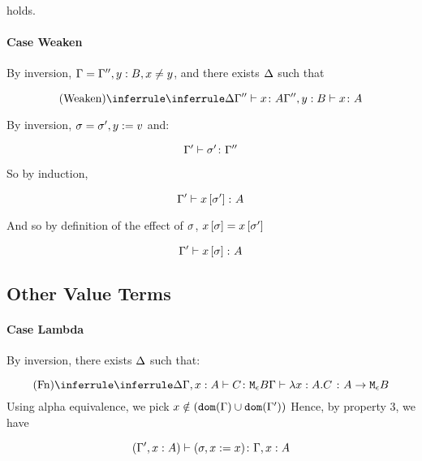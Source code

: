 {            holds.
            
        \paragraph{Case Weaken}
            By inversion, $\Gamma = \Gamma'', y: B, x \neq y$, and there exists $\Delta$ such that
 
            \begin{equation}
                \ntreeruleI{Weaken}{\treeruleI{\D}{\typerelation{\G''}{x}{A}}}{\typerelation{\G'', y: B}{x}{A}}
            \end{equation}

            By inversion, $\sigma = \sigma', y:= v$
            and:

            \begin{equation}
                \Gamma' \vdash \sigma' \colon \Gamma''
            \end{equation}

            So by induction,

            \begin{equation}
                \Gamma' \vdash x\left[\sigma'\right] \colon A
            \end{equation}

            And so by definition of the effect of $\sigma$, $x\left[\sigma\right] = x\left[\sigma'\right]$

            \begin{equation}
                \Gamma' \vdash x\left[\sigma\right] \colon A
            \end{equation}
    \subsection{Other Value Terms}
    \paragraph{Case Lambda}
        By inversion, there exists $\Delta$ such that:

        \begin{equation}
            \ntreeruleI{Fn}{
                \treeruleI{\D}{\typerelation{\G, x:A }{C}{\meb}}
            }{\typerelation{\G}{\lam{x}{A}{C}}{\aeb}}
        \end{equation}
        Using alpha equivalence, we pick $x\notin(\texttt{dom}(\Gamma)\cup\texttt{dom}(\Gamma'))$
        Hence, by property 3, we have

        \begin{equation}
            (\Gamma', x:A ) \vdash (\sigma, x:= x) \colon \Gamma, x: A
        \end{equation}

}
